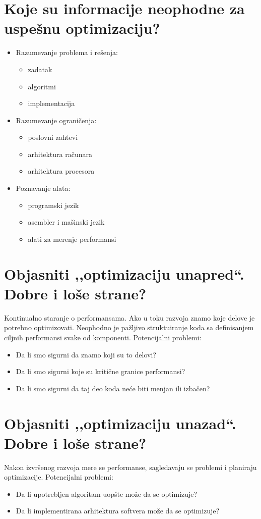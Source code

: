 \documentclass[a4paper]{article}
\begin{document}
\section{Koje su informacije neophodne za uspešnu optimizaciju?}
  \begin{itemize} 
    \item Razumevanje problema i rešenja:
      \begin{itemize}
        \item zadatak
        \item algoritmi
        \item implementacija 
      \end{itemize}
    \item Razumevanje ograničenja:
      \begin{itemize}
        \item poslovni zahtevi
        \item arhitektura računara
        \item arhitektura procesora 
      \end{itemize}
    \item Poznavanje alata:
      \begin{itemize}
        \item programski jezik
        \item asembler i mašinski jezik
        \item alati za merenje performansi
      \end{itemize}
  \end{itemize}
  
\section{Objasniti ,,optimizaciju unapred``. Dobre i loše strane?}
  Kontinualno staranje o performansama. Ako u toku razvoja znamo koje delove je potrebno optimizovati.
  Neophodno je pažljivo struktuiranje koda sa definisanjem ciljnih performansi svake od komponenti.
  Potencijalni problemi:
  \begin{itemize}
    \item Da li smo sigurni da znamo koji su to delovi?
    \item Da li smo sigurni koje su kritične granice performansi?
    \item Da li smo sigurni da taj deo koda neće biti menjan ili izbačen?
  \end{itemize}
\section{Objasniti ,,optimizaciju unazad``. Dobre i loše strane?}
  Nakon izvršenog razvoja mere se performanse, sagledavaju se problemi i planiraju optimizacije.
  Potencijalni problemi:
  \begin{itemize}
    \item Da li upotrebljen algoritam uopšte može da se optimizuje?
    \item Da li implementirana arhitektura softvera može da se optimizuje?
  \end{itemize}
\end{document}
